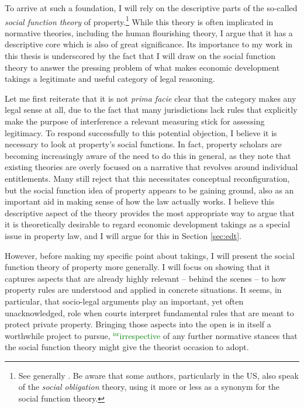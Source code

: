 \documentclass[12pt,a4paper]{book} %
\newcommand{\isr}[1]{\textcolor{green}{$^{\textrm{isr}}${#1}}}
\begin{document}
To arrive at such a foundation, I will rely on the descriptive parts of the so-called {\it social function theory} of property.\footnote{See generally \cite{foster11,mirow10,alexander09a}. Be aware that some authors, particularly in the US, also speak of the {\it social obligation} theory, using it more or less as a synonym for the social function theory.} While this theory is often implicated in normative theories, including the human flourishing theory, I argue that it has a descriptive core which is also of great significance. Its importance to my work in this thesis is underscored by the fact that I will draw on the social function theory to answer the pressing problem of what makes economic development takings a legitimate and useful category of legal reasoning. 

Let me first reiterate that it is not {\it prima facie} clear that the category makes any legal sense at all, due to the fact that many jurisdictions lack rules that explicitly make the purpose of interference a relevant measuring stick for assessing legitimacy. To respond successfully to this potential objection, I believe it is necessary to look at property's social functions. In fact, property scholars are becoming increasingly aware of the need to do this in general, as they note that existing theories are overly focused on a narrative that revolves around individual entitlements. Many still reject that this necessitates conceptual reconfiguration, but the social function idea of property appears to be gaining ground, also as an important aid in making sense of how the law actually works. I believe this descriptive aspect of the theory provides the most appropriate way to argue that it is theoretically desirable to regard economic development takings as a special issue in property law, and I will argue for this in Section \ref{sec:edt}.

However, before making my specific point about takings, I will present the social function theory of property more generally. I will focus on showing that it captures aspects that are already highly relevant -- behind the scenes -- to how property rules are understood and applied in concrete situations. It seems, in particular, that socio-legal arguments play an important, yet often unacknowledged, role when courts interpret fundamental rules that are meant to protect private property. Bringing those aspects into the open is in itself a worthwhile project to pursue, \isr{irrespective} of any further normative stances that the social function theory might give the theorist occasion to adopt.
\end{document}
